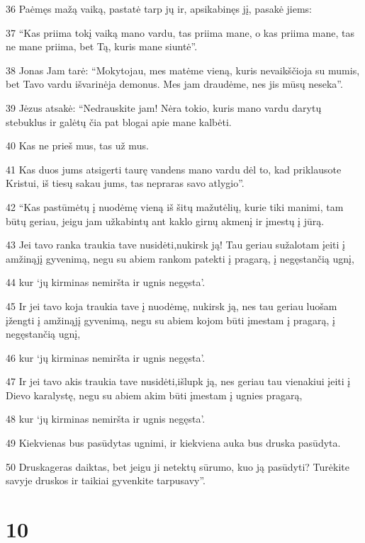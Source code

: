 \par 36 Paėmęs mažą vaiką, pastatė tarp jų ir, apsikabinęs jį, pasakė jiems: 
\par 37 “Kas priima tokį vaiką mano vardu, tas priima mane, o kas priima mane, tas ne mane priima, bet Tą, kuris mane siuntė”. 
\par 38 Jonas Jam tarė: “Mokytojau, mes matėme vieną, kuris nevaikščioja su mumis, bet Tavo vardu išvarinėja demonus. Mes jam draudėme, nes jis mūsų neseka”. 
\par 39 Jėzus atsakė: “Nedrauskite jam! Nėra tokio, kuris mano vardu darytų stebuklus ir galėtų čia pat blogai apie mane kalbėti. 
\par 40 Kas ne prieš mus, tas už mus. 
\par 41 Kas duos jums atsigerti taurę vandens mano vardu dėl to, kad priklausote Kristui, iš tiesų sakau jums, tas nepraras savo atlygio”. 
\par 42 “Kas pastūmėtų į nuodėmę vieną iš šitų mažutėlių, kurie tiki manimi, tam būtų geriau, jeigu jam užkabintų ant kaklo girnų akmenį ir įmestų į jūrą. 
\par 43 Jei tavo ranka traukia tave nusidėti,­nukirsk ją! Tau geriau sužalotam įeiti į amžinąjį gyvenimą, negu su abiem rankom patekti į pragarą, į negęstančią ugnį, 
\par 44 kur ‘jų kirminas nemiršta ir ugnis negęsta’. 
\par 45 Ir jei tavo koja traukia tave į nuodėmę, nukirsk ją, nes tau geriau luošam įžengti į amžinąjį gyvenimą, negu su abiem kojom būti įmestam į pragarą, į negęstančią ugnį, 
\par 46 kur ‘jų kirminas nemiršta ir ugnis negęsta’. 
\par 47 Ir jei tavo akis traukia tave nusidėti,­išlupk ją, nes geriau tau vienakiui įeiti į Dievo karalystę, negu su abiem akim būti įmestam į ugnies pragarą, 
\par 48 kur ‘jų kirminas nemiršta ir ugnis negęsta’. 
\par 49 Kiekvienas bus pasūdytas ugnimi, ir kiekviena auka bus druska pasūdyta. 
\par 50 Druska­geras daiktas, bet jeigu ji netektų sūrumo, kuo ją pasūdyti? Turėkite savyje druskos ir taikiai gyvenkite tarpusavy”.



\chapter{10}



